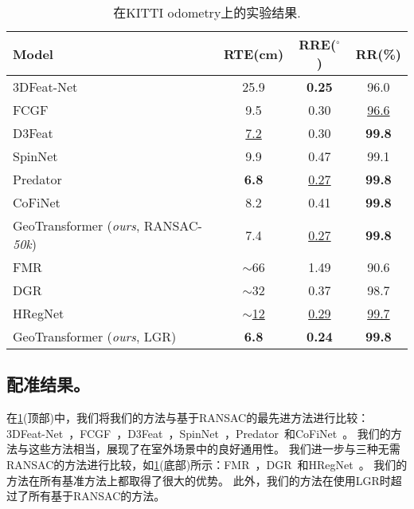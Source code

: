 \begin{table}[!t]
  \scriptsize
  \centering
  \begin{tabular}{l|ccc}
  \toprule
  Model & RTE(cm) & RRE($^{\circ}$) & RR(\%) \\
  \midrule
  3DFeat-Net~\cite{yew20183dfeat} & 25.9 & \textbf{0.25} & 96.0 \\
  FCGF~\cite{choy2019fully} & 9.5 & 0.30 & \underline{96.6} \\
  D3Feat~\cite{bai2020d3feat} & \underline{7.2} & 0.30 & \textbf{99.8} \\
  SpinNet~\cite{ao2021spinnet} & 9.9 & 0.47 & 99.1 \\
  Predator~\cite{huang2021predator} & \textbf{6.8} & \underline{0.27} & \textbf{99.8} \\
  CoFiNet~\cite{yu2021cofinet} & 8.2 & 0.41 & \textbf{99.8} \\
  GeoTransformer (\emph{ours}, RANSAC-\emph{50k}) & 7.4 & \underline{0.27} & \textbf{99.8} \\
  \midrule
  FMR~\cite{huang2020feature} & $\sim$66 & 1.49 & 90.6 \\
  DGR~\cite{choy2020deep} & $\sim$32 & 0.37 & 98.7 \\
  HRegNet~\cite{lu2021hregnet} & $\sim$\underline{12} & \underline{0.29} & \underline{99.7} \\
  GeoTransformer (\emph{ours}, LGR) & \textbf{6.8} & \textbf{0.24} & \textbf{99.8} \\
  \bottomrule
  \end{tabular}
  \vspace{-5pt}
  \caption{
  在KITTI odometry上的实验结果.
  }
  \vspace{-10pt}
  \label{table:kitti}
\end{table}

\subsection{配准结果。}
在\ref{table:kitti}(顶部)中，我们将我们的方法与基于RANSAC的最先进方法进行比较：3DFeat-Net~\cite{yew20183dfeat}，FCGF~\cite{choy2019fully}，D3Feat~\cite{bai2020d3feat}，SpinNet~\cite{ao2021spinnet}，Predator~\cite{huang2021predator}和CoFiNet~\cite{yu2021cofinet}。
我们的方法与这些方法相当，展现了在室外场景中的良好通用性。
我们进一步与三种无需RANSAC的方法进行比较，如\ref{table:kitti}(底部)所示：FMR~\cite{huang2020feature}，DGR~\cite{choy2020deep}和HRegNet~\cite{lu2021hregnet}。
我们的方法在所有基准方法上都取得了很大的优势。
此外，我们的方法在使用LGR时超过了所有基于RANSAC的方法。